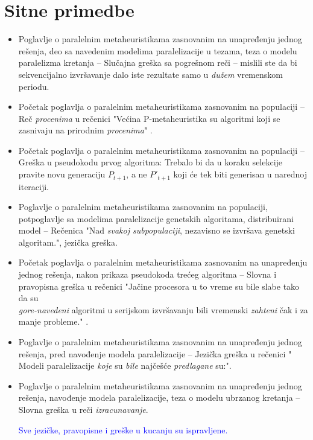 \documentclass[a4paper]{report}
\newcommand{\odgovor}[1]{\textcolor{blue}{#1}}
\begin{document}
		
        	
        
        
\section{Sitne primedbe}

\begin{itemize}
    \item {Poglavlje o paralelnim metaheuristikama zasnovanim na unapređenju
jednog rešenja, deo sa navedenim modelima paralelizacije u tezama, teza o modelu paralelizma kretanja -- Slučajna greška sa pogrešnom reči -- mislili ste da bi sekvencijalno izvršavanje dalo iste rezultate samo u \textit{dužem} vremenskom periodu.} 
    \item{ Početak poglavlja o paralelnim metaheuristikama zasnovanim na populaciji -- Reč \textit{procenima} u rečenici "Većina P-metaheuristika su algoritmi koji se zasnivaju na prirodnim
\textit{procenima}" .}
    \item{ Početak poglavlja o paralelnim metaheuristikama zasnovanim na populaciji -- Greška u pseudokodu prvog algoritma: Trebalo bi da u koraku selekcije pravite novu generaciju $P_{t+1}$, a ne $P'_{t+1}$ koji će tek biti generisan u narednoj iteraciji.}
    \item{ Poglavlje o paralelnim metaheuristikama zasnovanim na populaciji, potpoglavlje sa modelima paralelizacije genetskih algoritama, distribuirani model -- Rečenica "Nad \textit{svakoj subpopulaciji}, nezavisno se izvršava genetski algoritam.", jezička greška.}
    \item{ Početak poglavlja o paralelnim metaheuristikama zasnovanim na unapređenju jednog rešenja, nakon prikaza pseudokoda trećeg algoritma -- Slovna i pravopisna greška u rečenici "Jačine procesora u to vreme su bile slabe tako da
su \\ \textit{gore-navedeni} algoritmi u serijskom izvršavanju bili vremenski \textit{zahteni}
čak i za manje probleme." .}
    \item{Poglavlje o paralelnim metaheuristikama zasnovanim na unapređenju
jednog rešenja, pred navođenje modela paralelizacije -- Jezička greška u rečenici "
Modeli paralelizacije \textit{koje} su \textit{bile} najčešće \textit{predlagane} su:".}
    \item{Poglavlje o paralelnim metaheuristikama zasnovanim na unapređenju
jednog rešenja, navođenje modela paralelizacije, teza o modelu ubrzanog kretanja -- Slovna greška u reči \textit{izracunavanje}.}

\odgovor{Sve jezičke, pravopisne i greške u kucanju su ispravljene.}
\end{itemize}
\end{document}
